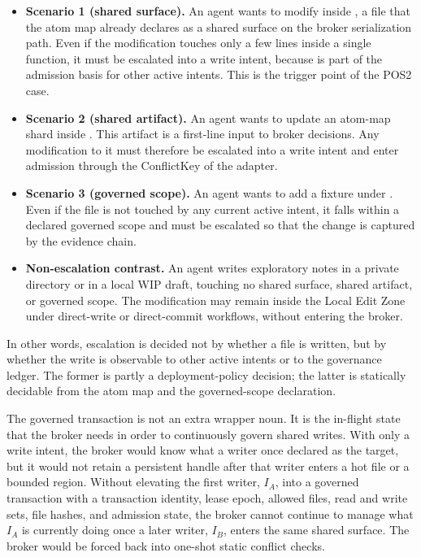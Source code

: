 \documentclass[9pt,letterpaper]{extarticle}
\begin{document}
\begin{itemize}
\item \textbf{Scenario 1 (shared surface).} An agent wants to modify \texttt{} inside \texttt{}, a file that the atom map already declares as a shared surface on the broker serialization path. Even if the modification touches only a few lines inside a single function, it must be escalated into a write intent, because \texttt{} is part of the admission basis for other active intents. This is the trigger point of the POS2 case.
\item \textbf{Scenario 2 (shared artifact).} An agent wants to update an atom-map shard inside \texttt{}. This artifact is a first-line input to broker decisions. Any modification to it must therefore be escalated into a write intent and enter admission through the ConflictKey of the \texttt{} adapter.
\item \textbf{Scenario 3 (governed scope).} An agent wants to add a fixture under \texttt{}. Even if the file is not touched by any current active intent, it falls within a declared governed scope and must be escalated so that the change is captured by the evidence chain.
\item \textbf{Non-escalation contrast.} An agent writes exploratory notes in a private \texttt{} directory or in a local WIP draft, touching no shared surface, shared artifact, or governed scope. The modification may remain inside the Local Edit Zone under direct-write or direct-commit workflows, without entering the broker.
\end{itemize}

In other words, escalation is decided not by whether a file is written, but by whether the write is observable to other active intents or to the governance ledger. The former is partly a deployment-policy decision; the latter is statically decidable from the atom map and the governed-scope declaration.

The governed transaction is not an extra wrapper noun. It is the in-flight state that the broker needs in order to continuously govern shared writes. With only a write intent, the broker would know what a writer once declared as the target, but it would not retain a persistent handle after that writer enters a hot file or a bounded region. Without elevating the first writer, $I_A$, into a governed transaction with a transaction identity, lease epoch, allowed files, read and write sets, file hashes, and admission state, the broker cannot continue to manage what $I_A$ is currently doing once a later writer, $I_B$, enters the same shared surface. The broker would be forced back into one-shot static conflict checks.
\end{document}
